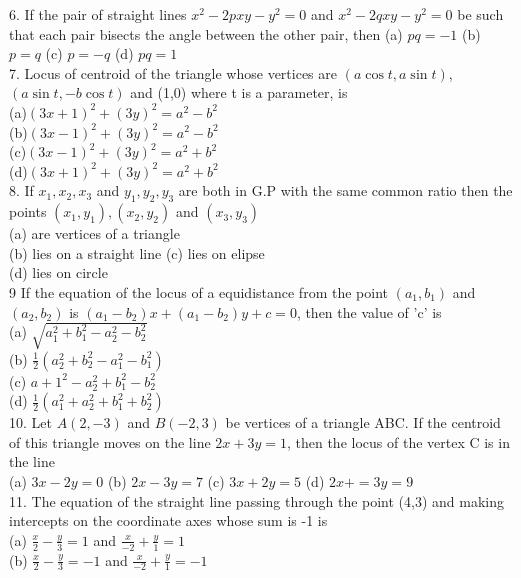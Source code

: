 \documentclass[12pt]{article}
\begin{document}
6. If the pair of straight lines $x^2-2pxy-y^2=0$ and $x^2-2qxy-y^2=0$ be such that each pair bisects the angle between the other pair, then 
(a) $pq=-1$  \hspace{1cm} (b) $p=q$  \hspace{1cm} (c) $p=-q$  \hspace{1cm} (d) $pq=1$\\
7. Locus of centroid of the triangle whose vertices are $(a\cos t, a\sin t)$, $(a\sin t,-b\cos t)$ and (1,0) where t is a parameter, is \\
(a)$(3x+1)^2+(3y)^2=a^2-b^2$\\
(b)$(3x-1)^2+(3y)^2=a^2-b^2$\\
(c)$(3x-1)^2+(3y)^2=a^2+b^2$\\
(d)$(3x+1)^2+(3y)^2=a^2+b^2$\\
8. If $x_1,x_2,x_3$ and $y_1,y_2,y_3$ are both in G.P with the same common ratio then the points $(x_1,y_1),(x_2,y_2)$ and $(x_3,y_3)$\\
(a) are vertices of a triangle\\
(b) lies on a straight line
(c) lies on elipse\\
(d) lies on circle\\
9 If the equation of the locus of a equidistance from the point $(a_1,b_1)$ and $(a_2,b_2)$ is $(a_1-b_2)x+(a_1-b_2)y+c=0$, then the value of 'c' is\\
(a) $\sqrt{a_1^2+b_1^2-a_2^2-b_2^2}$\\
(b) $\frac{1}{2}(a_2^2+b_2^2-a_1^2-b_1^2)$\\
(c) $a+1^2-a_2^2+b_1^2-b_2^2$\\
(d) $\frac{1}{2}(a_1^2+a_2^2+b_1^2+b_2^2)$\\
10. Let $A(2,-3)$ and $B(-2,3)$ be vertices of a triangle ABC. If the centroid of this triangle moves on the line $2x+3y=1$, then the locus of the vertex C is in the line \\
(a) $3x-2y=0$ \hspace{1cm} (b) $2x-3y=7$ \hspace{1cm} (c) $3x+2y=5$ \hspace{1cm} (d) $2x+=3y=9$\\
11. The equation of the straight line passing through the point (4,3) and making intercepts on the coordinate axes whose sum is -1 is \\
(a) $\frac{x}{2}-\frac{y}{3}=1$ and $\frac{x}{-2}+\frac{y}{1}=1$\\
(b) $\frac{x}{2}-\frac{y}{3}=-1$ and $\frac{x}{-2}+\frac{y}{1}=-1$\\
\end{document}
